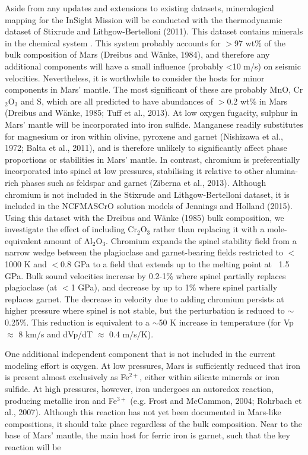 Aside from any updates and extensions to existing datasets, mineralogical mapping for the InSight Mission will be conducted with the thermodynamic dataset of Stixrude and Lithgow-Bertelloni (2011). This dataset contains minerals in the chemical system . This system probably accounts for $>$97 wt\% of the bulk composition of Mars (Dreibus and W\"{a}nke, 1984), and therefore any additional components will have a small influence (probably <10 m/s) on seismic velocities. Nevertheless, it is worthwhile to consider the hosts for minor components in Mars' mantle. The most significant of these are probably MnO, Cr$_2$O$_3$ and S, which are all predicted to have abundances of $>$0.2 wt\% in Mars (Dreibus and W\"{a}nke, 1985; Tuff et al., 2013). At low oxygen fugacity, sulphur in Mars' mantle will be incorporated into iron sulfide. Manganese readily substitutes for magnesium or iron within olivine, pyroxene and garnet (Nishizawa et al., 1972; Balta et al., 2011), and is therefore unlikely to significantly affect phase proportions or stabilities in Mars' mantle. In contrast, chromium is preferentially incorporated into spinel at low pressures, stabilising it relative to other alumina-rich phases such as feldspar and garnet (Ziberna et al., 2013). Although chromium is not included in the Stixrude and Lithgow-Bertelloni dataset, it is included in the NCFMASCrO solution models of Jennings and Holland (2015). Using this dataset with the Dreibus and W\"{a}nke (1985) bulk composition, we investigate the effect of including Cr$_2$O$_3$ rather than replacing it with a mole-equivalent amount of Al$_2$O$_3$. Chromium expands the spinel stability field from a narrow wedge between the plagioclase and garnet-bearing fields restricted to $<$1000 K and $<$0.8 GPa to a field that extends up to the melting point at ~1.5 GPa. Bulk sound velocities increase by 0.2-1\% where spinel partially replaces plagioclase (at $<$1 GPa), and decrease by up to 1\% where spinel partially replaces garnet. The decrease in velocity due to adding chromium persists at higher pressure where spinel is not stable, but the perturbation is reduced to $\sim$0.25\%. This reduction is equivalent to a $\sim$50 K increase in temperature (for Vp $\approx$ 8 km/s and dVp/dT $\approx$ 0.4 m/s/K).

One additional independent component that is not included in the current modeling effort is oxygen. At low pressures, Mars is sufficiently reduced that iron is present almost exclusively as Fe$^{2+}$, either within silicate minerals or iron sulfide. At high pressures, however, iron undergoes an autoredox reaction, producing metallic iron and Fe$^{3+}$ (e.g. Frost and McCammon, 2004; Rohrbach et al., 2007). Although this reaction has not yet been documented in Mars-like compositions, it should take place regardless of the bulk composition. Near to the base of Mars' mantle, the main host for ferric iron is garnet, such that the key reaction will be


